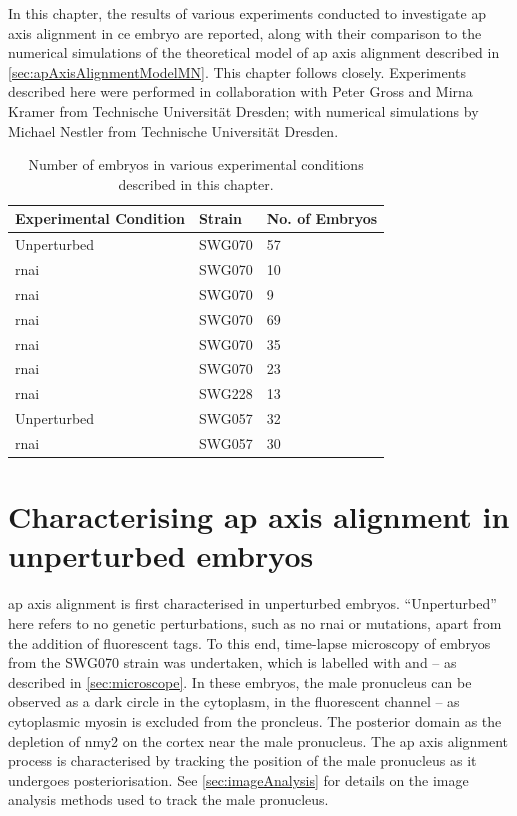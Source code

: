 In this chapter, the results of various experiments conducted to investigate \ac{ap} axis alignment in \ac{ce} embryo are reported, along with their comparison to the numerical simulations of the theoretical model of \ac{ap} axis alignment described in \autoref{sec:apAxisAlignmentModelMN}. This chapter follows \citep{axisConvergence} closely. Experiments described here were performed in collaboration with Peter Gross and Mirna Kramer from Technische Universit{\"a}t Dresden; with numerical simulations by Michael Nestler from Technische Universit{\"a}t Dresden.

\begin{table}
    \centering
    \begin{tabular}{|C{0.3\textwidth}|C{0.3\textwidth}|C{0.3\textwidth}|}
        \hline
        Experimental Condition & Strain & No. of Embryos\\
        \hline
        Unperturbed & SWG070 & \num{57}\\
         \ac{rnai} & SWG070 & \num{10}\\
         \ac{rnai} & SWG070 & \num{9}\\
         \ac{rnai} & SWG070 & \num{69}\\
         \ac{rnai} & SWG070 & \num{35}\\
         \ac{rnai} & SWG070 & \num{23}\\
         \ac{rnai} & SWG228 & \num{13}\\
        Unperturbed & SWG057 & \num{32}\\
         \ac{rnai} & SWG057 & \num{30}\\
        \hline
    \end{tabular}
    \caption{Number of embryos in various experimental conditions described in this chapter.}
    \label{tab:resultsNumberEmbryo}
\end{table}

\section{Characterising \acs{ap} axis alignment in unperturbed embryos} \label{sec:apAxisAlignCharacteriseWT}
\ac{ap} axis alignment is first characterised in unperturbed embryos. \enquote{Unperturbed} here refers to no genetic perturbations, such as no \ac{rnai} or mutations, apart from the addition of fluorescent tags. To this end, time-lapse microscopy of embryos from the SWG070 strain was undertaken, which is labelled with  and  -- as described in \autoref{sec:microscope}. In these embryos, the male pronucleus can be observed as a dark circle in the cytoplasm, in the  fluorescent channel -- as cytoplasmic myosin is excluded from the proncleus. The posterior domain as the depletion of \ac{nmy2} on the cortex near the male pronucleus. The \ac{ap} axis alignment process is characterised by tracking the position of the male pronucleus as it undergoes posteriorisation. See \autoref{sec:imageAnalysis} for details on the image analysis methods used to track the male pronucleus. 

